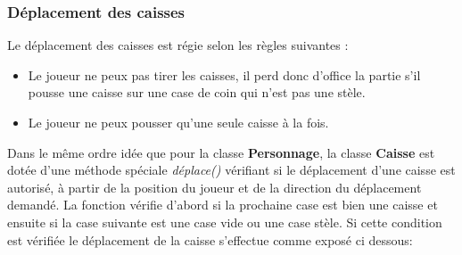 \documentclass{article}
\begin{document}
		\subsubsection{Déplacement des caisses}
Le déplacement des caisses est régie selon les règles suivantes : 
\begin{itemize}
\item Le joueur ne peux pas tirer les caisses, il perd donc d'office la partie s'il pousse une caisse sur une case de coin qui n'est pas une stèle.
\item Le joueur ne peux pousser qu'une seule caisse à la fois.
\end{itemize}		
Dans le même ordre idée que pour la classe \textbf{Personnage}, la classe \textbf{Caisse} est dotée d'une méthode spéciale \textit{déplace()} vérifiant si le déplacement 
d'une caisse est autorisé, à partir de la position du joueur et de la direction du déplacement demandé. La fonction vérifie d'abord si la prochaine case est bien une caisse 
et ensuite si la case suivante est une case vide ou une case stèle. Si cette condition est vérifiée le déplacement de la caisse s'effectue comme exposé ci dessous:
\end{document}
